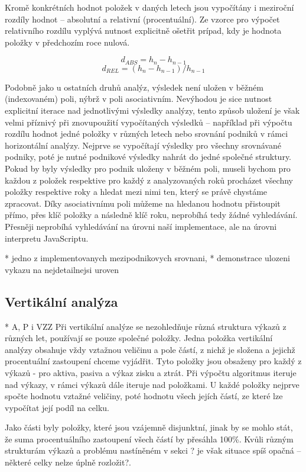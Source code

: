 Kromě konkrétních hodnot položek v daných letech jsou vypočítány i meziroční rozdíly hodnot -- absolutní a relativní (procentuální). Ze vzorce pro výpočet relativního rozdílu vyplývá nutnost explicitně ošetřit prípad, kdy je hodnota položky v předchozím roce nulová.

$$d_{ABS}=h_{n}-h_{n-1}$$
$$d_{REL}=(h_{n}-h_{n-1})/h_{n-1}$$


Podobně jako u ostatních druhů analýz, výsledek není uložen v běžném (indexovaném) poli, nýbrž v poli asociativním. Nevýhodou je sice nutnost explicitní iterace nad jednotlivými výsledky analýzy, tento způsob uložení je však velmi příznivý při znovupoužití vypočítaných výsledků -- například při výpočtu rozdílu hodnot jedné položky v různých letech nebo srovnání podniků v rámci horizontální analýzy. Nejprve se vypočítají výsledky pro všechny srovnávané podniky, poté je nutné podnikové výsledky nahrát do jedné společné struktury. Pokud by byly výsledky pro podnik uloženy v běžném poli, museli bychom pro každou z položek respektive pro každý z analyzovaných roků procházet všechny položky respektive roky a hledat mezi nimi ten, který se právě chystáme zpracovat. Díky asociativnímu poli můžeme na hledanou hodnotu přistoupit přímo, přes klíč položky a následně klíč roku, neprobíhá tedy žádné vyhledávání. Přesněji neprobíhá vyhledávání na úrovni naší implementace, ale na úrovni interpretu JavaScriptu.

* jedno z implementovanych mezipodnikovych srovnani, 
* demonstrace ulozeni vykazu na nejdetailnejsi uroven


\subsection{Vertikální analýza}
* A, P i VZZ
Při vertikální analýze se nezohledňuje různá struktura výkazů z různých let, používají se pouze společné položky. Jedna položka vertikální analýzy obsahuje vždy vztažnou veličinu a pole částí, z nichž je složena a jejichž procentuální zastoupení chceme vyjádřit. Tyto položky jsou obsaženy pro každý z výkazů - pro aktiva, pasiva a výkaz zisku a ztrát. Při výpočtu algoritmus iteruje nad výkazy, v rámci výkazů dále iteruje nad položkami. U každé položky nejprve spočte hodnotu vztažné veličiny, poté hodnotu všech jejích částí, ze které lze vypočítat její podíl na celku.

Jako části byly položky, které jsou vzájemně disjunktní, jinak by se mohlo stát, že suma procentuálního zastoupení všech částí by přesáhla 100\%. Kvůli různým strukturám výkazů a problému nastíněném v sekci ? je však situace spíš opačná -- některé celky nelze úplně rozložit?.


